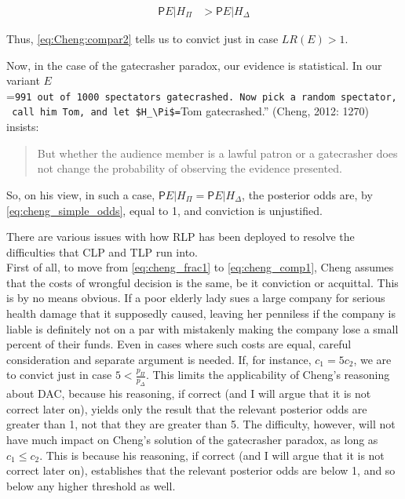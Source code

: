 \documentclass[10pt,dvipsnames,enabledeprecatedfontcommands]{scrartcl}
\newcommand{\pr}{\mathsf{P}}
\begin{document}
\begin{align}\label{eq:Cheng:compar2}
\pr{E\vert H_\Pi} &> \pr{E\vert H_\Delta}
\end{align}

Thus, \eqref{eq:Cheng:compar2} tells us to convict just in case
\(LR(E)>1\).

Now, in the case of the gatecrasher paradox, our evidence is
statistical. In our variant
\(E\)=\texttt{991\ out\ of\ 1000\ spectators\ gatecrashed\textquotesingle{}\textquotesingle{}.\ Now\ pick\ a\ random\ spectator,\ call\ him\ Tom,\ and\ let\ \$H\_\textbackslash{}Pi\$=}Tom
gatecrashed.'' (Cheng, 2012: 1270) insists:

\begin{quote}
But whether the audience member is a lawful patron or a gatecrasher does not change the probability of observing the evidence presented.
\end{quote}

\noindent So, on his view, in such a case,
\(\pr{E\vert H_\Pi}=\pr{E\vert H_\Delta}\), the posterior odds are, by
\eqref{eq:cheng_simple_odds}, equal to 1, and conviction is unjustified.

There are various issues with how RLP has been deployed to resolve the
difficulties that CLP and TLP run into.\\
First of all, to move from \eqref{eq:cheng_frac1} to
\eqref{eq:cheng_comp1}, Cheng assumes that the costs of wrongful
decision is the same, be it conviction or acquittal. This is by no means
obvious. If a poor elderly lady sues a large company for serious health
damage that it supposedly caused, leaving her penniless if the company
is liable is definitely not on a par with mistakenly making the company
lose a small percent of their funds. Even in cases where such costs are
equal, careful consideration and separate argument is needed. If, for
instance, \(c_1=5c_2\), we are to convict just in case
\(5<\frac{p_\Pi}{p_\Delta}\). This limits the applicability of Cheng's
reasoning about DAC, because his reasoning, if correct (and I will argue
that it is not correct later on), yields only the result that the
relevant posterior odds are greater than 1, not that they are greater
than 5. The difficulty, however, will not have much impact on Cheng's
solution of the gatecrasher paradox, as long as \(c_1\leq c_2\). This is
because his reasoning, if correct (and I will argue that it is not
correct later on), establishes that the relevant posterior odds are
below 1, and so below any higher threshold as well.
\end{document}
